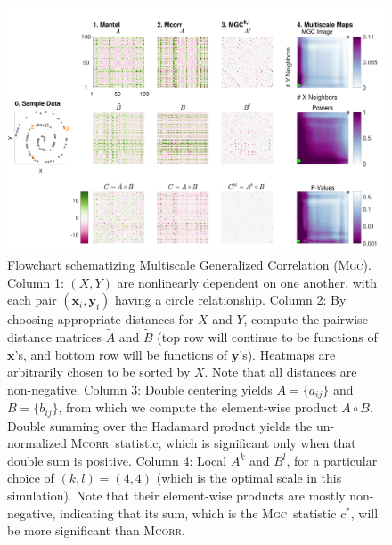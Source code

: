 \documentclass[11pt]{article}
\providecommand{\sct}[1]{{\normalfont\textsc{#1}}}
\providecommand{\mb}[1]{\boldsymbol{#1}}
\newcommand{\G}{c}
\newcommand{\Mgc}{\sct{Mgc}}
\newcommand{\Mcorr}{\sct{Mcorr}}
\newcommand{\mbx}{\ensuremath{\mb{x}}}
\newcommand{\mby}{\ensuremath{\mb{y}}}
\begin{document}
\begin{figure}[htbp]
\includegraphics[width=1.0\textwidth]{../Figures/FigA}
\caption{
Flowchart schematizing Multiscale Generalized Correlation (\Mgc).
Column 1: $(X,Y)$ are nonlinearly dependent on one another, with each pair $(\mbx_i,\mby_i)$ having a circle relationship.
Column 2: By choosing appropriate distances for $X$ and $Y$, compute the pairwise distance matrices $\tilde{A}$ and $\tilde{B}$ (top row will continue to be functions of \mbx's, and bottom row will be functions of \mby's).  
Heatmaps  are arbitrarily chosen to be sorted by $X$. 
Note that all distances are non-negative.
Column 3: Double centering yields $A=\{a_{ij}\}$ and $B=\{b_{ij}\}$, from which we compute the element-wise product $A \circ B$.  Double summing over the Hadamard product yields the un-normalized \Mcorr~statistic, which is significant only when that double sum is positive. 
Column 4: Local $A^{k}$ and $B^{l}$, for a particular choice of $(k,l)=(4,4)$ (which is the optimal scale in this simulation). Note that their element-wise products are mostly non-negative, indicating that its sum, which is the \Mgc~statistic $\G^*$, will be more significant than \Mcorr.
}
\end{figure}
\end{document}
